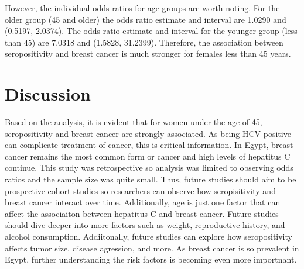 \documentclass[12pt, titlepage]{article}
\begin{document}
However, the individual odds ratios for age groups are worth noting. For 
the older group (45 and older) the odds ratio estimate and interval are 
1.0290 and (0.5197, 2.0374). The odds ratio estimate and interval for the 
younger group (less than 45) are 7.0318 and (1.5828, 31.2399). Therefore,
the association between seropositivity and breast cancer is much stronger
for females less than 45 years. 

\section{Discussion}
\label{sec:discuss}
Based on the analysis, it is evident that for women under the age of 45,
seropositivity and breast cancer are strongly associated. As being HCV 
positive can complicate treatment of cancer, this is critical information.
In Egypt, breast cancer remains the most common form or cancer and high 
levels of hepatitus C continue. This study was retrospective so analysis 
was limited to observing odds ratios and the sample size was quite small.
Thus, future studies should aim to be prospective cohort studies so 
researchers can observe how seropisitivity and breast cancer interact 
over time. 
Additionally, age is just one factor that can affect the associaiton 
between hepatitus C and breast cancer. Future studies should dive 
deeper into more factors such as weight, reproductive history, 
and alcohol consumption. Addiitonally, future studies can explore how 
seropositivity affects tumor size, disease agression, and more. As 
breast cancer is so prevalent in Egypt, further understanding the 
risk factors is becoming even more importnant. 




\end{document}
